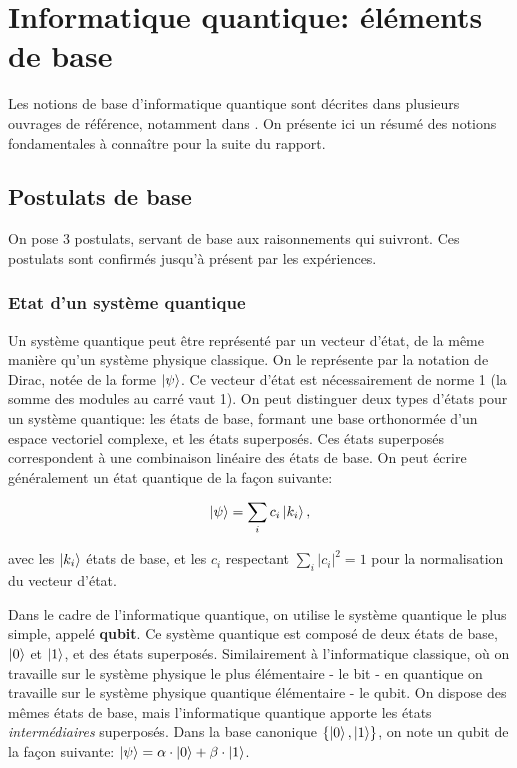 \chapter{Informatique quantique: éléments de base}


Les notions de base d'informatique quantique sont décrites dans plusieurs ouvrages de référence, notamment dans \cite{Nielsen00, Mermin07}. On présente ici un résumé des notions fondamentales à connaître pour la suite du rapport.

\section{Postulats de base}

On pose 3 postulats, servant de base aux raisonnements qui suivront. Ces postulats sont confirmés jusqu'à présent par les expériences.

\subsection{Etat d'un système quantique}
Un système quantique peut être représenté par un vecteur d'état, de la même manière qu'un système physique classique. On le représente par la notation de Dirac, notée de la forme $\ket{\psi}$. Ce vecteur d'état est nécessairement de norme 1 (la somme des modules au carré vaut 1). On peut distinguer deux types d'états pour un système quantique: les états de base, formant une base orthonormée d'un espace vectoriel complexe, et les états superposés. Ces états superposés correspondent à une combinaison linéaire des états de base. On peut écrire généralement un état quantique de la façon suivante:

\begin{equation}
    \ket{\psi} = \displaystyle\sum_{i} c_i \ket{k_i},
\end{equation}

avec les $\ket{k_i}$ états de base, et les $c_i$ respectant $ \displaystyle\sum_{i} |c_i|^2 = 1$ pour la normalisation du vecteur d'état.

\medbreak

Dans le cadre de l'informatique quantique, on utilise le système quantique le plus simple, appelé \textbf{qubit}. Ce système quantique est composé de deux états de base, $\ket{0}$ et $\ket{1}$, et des états superposés. Similairement à l'informatique classique, où on travaille sur le système physique le plus élémentaire - le bit - en quantique on travaille sur le système physique quantique élémentaire - le qubit. On dispose des mêmes états de base, mais l'informatique quantique apporte les états \textit{intermédiaires} superposés. Dans la base canonique $\{\ket{0}, \ket{1}\}$, on note un qubit de la façon suivante: $\ket{\psi} = \alpha \cdot \ket{0} + \beta \cdot \ket{1}$.

